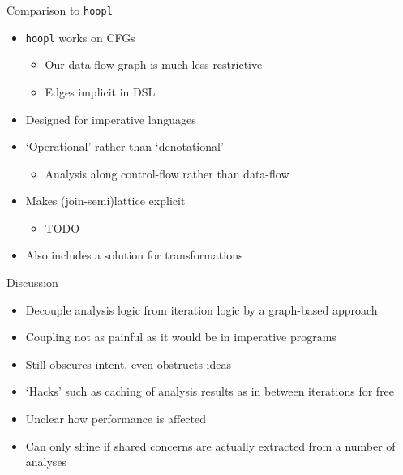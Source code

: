 \documentclass{haskellbeamer}
\begin{document}
\begin{frame}{Comparison to \texttt{hoopl}}
  \begin{itemize}
    \item \texttt{hoopl} \parencite{hoopl} works on CFGs
      \begin{itemize}
        \item Our data-flow graph is much less restrictive
        \item Edges implicit in DSL 
      \end{itemize}
    \item Designed for imperative languages
    \item `Operational' rather than `denotational'
      \begin{itemize}
        \item Analysis along control-flow rather than data-flow
      \end{itemize}
    \item Makes (join-semi)lattice explicit
      \begin{itemize}
        \item TODO
      \end{itemize}
    \item Also includes a solution for transformations
  \end{itemize}
\end{frame}

\begin{frame}{Discussion}
  \begin{itemize}
    \item[\cmark] Decouple analysis logic from iteration logic by a graph-based approach
    \item[\xmark] Coupling not as painful as it would be in imperative programs
    \item[\cmark] Still obscures intent, even obstructs ideas
    \item[\cmark] `Hacks' such as caching of analysis results as in \textcite[§9.2]{dmd} between iterations for free
    \item[\xmark] Unclear how performance is affected
    \item[\xmark] Can only shine if shared concerns are actually extracted from a number of analyses
  \end{itemize}
\end{frame}
\end{document}
